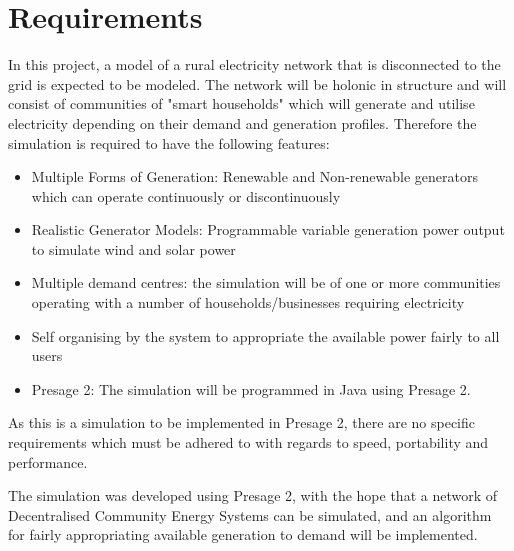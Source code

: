 \chapter{Requirements}
\label{Requirements}
In this project, a model of a rural electricity network that is disconnected to the grid is expected to be modeled. The network will be holonic in structure and will consist of communities of "smart households" which will generate and utilise electricity depending on their demand and generation profiles. Therefore the simulation is required to have the following features:
\begin{itemize}
  \item Multiple Forms of Generation: Renewable and Non-renewable generators which can operate continuously or discontinuously
  \item Realistic Generator Models: Programmable variable generation power output to simulate wind and solar power
  \item Multiple demand centres: the simulation will be of one or more communities operating with a number of households/businesses requiring electricity
  \item Self organising by the system to appropriate the available power fairly to all users
  \item Presage 2: The simulation will be programmed in Java using Presage 2.
\end{itemize}

As this is a simulation to be implemented in Presage 2, there are no specific requirements which must be adhered to with regards to speed, portability and performance.  

The simulation was developed using Presage 2, with the hope that a network of Decentralised Community Energy Systems can be simulated, and an algorithm for fairly appropriating available generation to demand will be implemented. 